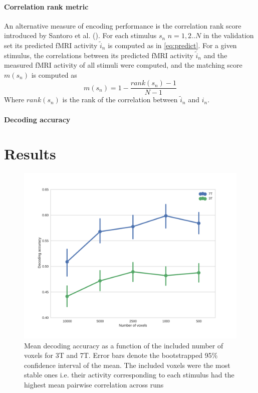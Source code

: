 \paragraph{Correlation rank metric}
An alternative measure of encoding performance is the correlation rank score introduced by Santoro et al. (\cite{SF14}). For each stimulus $s_{n}$ $n=1,2..N$  in the validation set its predicted f{MRI} activity $\widetilde{i}_{n}$ is computed as in \ref{eq:predict}.
For a given stimulus, the correlations between its predicted f{MRI} activity $\widetilde{i}_{n}$ and the measured f{MRI} activity of all stimuli were computed, and the matching score $m(s_{n})$ is computed as
\[ m(s_{n}) = 1-\frac{rank(s_{n})-1}{N-1} \]
Where $rank(s_{n})$ is the rank of the correlation between $\widetilde{i}_{n}$ and $i_{n}$.

\paragraph{Decoding accuracy}


\section*{Results}

	
\begin{figure}
	\centering
	\includegraphics[width=\linewidth]{pics/nr_of_voxels_both}
	\caption{Mean decoding accuracy as a function of the included number of voxels for 3T and 7T. Error bars denote the bootstrapped 95\% confidence interval of the mean. The included voxels were the most stable ones i.e. their activity corresponding to each stimulus had the highest mean pairwise correlation across runs}
	\label{fig:voxelnr}
\end{figure}
 
